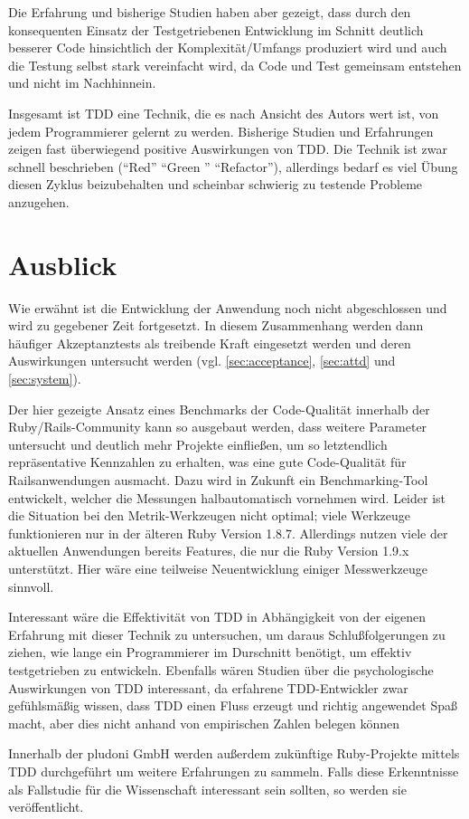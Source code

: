 Die Erfahrung und bisherige Studien haben aber gezeigt, dass durch den konsequenten Einsatz der Testgetriebenen Entwicklung im Schnitt deutlich besserer Code hinsichtlich der Komplexität/Umfangs produziert wird und auch die Testung selbst stark vereinfacht wird, da Code und Test gemeinsam entstehen und nicht im Nachhinnein.

Insgesamt ist TDD eine Technik, die es nach Ansicht des Autors wert ist, von jedem Programmierer gelernt zu werden. Bisherige Studien und Erfahrungen zeigen fast überwiegend positive Auswirkungen von TDD. Die Technik ist zwar schnell beschrieben ("`Red"' "`Green "' "`Refactor"'), allerdings bedarf es viel Übung diesen Zyklus beizubehalten und scheinbar schwierig zu testende Probleme anzugehen.

\section{Ausblick}
Wie erwähnt ist die Entwicklung der Anwendung noch nicht abgeschlossen und wird zu gegebener Zeit fortgesetzt. In diesem Zusammenhang werden dann häufiger Akzeptanztests als treibende Kraft eingesetzt werden und deren Auswirkungen untersucht werden (vgl. \ref{sec:acceptance}, \ref{sec:attd} und \ref{sec:system}).

Der hier gezeigte Ansatz eines Benchmarks der Code-Qualität innerhalb der Ruby/Rails\hyp{}Community kann so ausgebaut werden, dass weitere Parameter untersucht und deutlich mehr Projekte einfließen, um so letztendlich repräsentative Kennzahlen zu erhalten, was eine gute Code-Qualität für Railsanwendungen ausmacht. Dazu wird in Zukunft ein Benchmarking-Tool entwickelt, welcher die Messungen halbautomatisch vornehmen wird. Leider ist die Situation bei den Metrik-Werkzeugen nicht optimal; viele Werkzeuge funktionieren nur in der älteren Ruby Version 1.8.7. Allerdings nutzen viele der aktuellen Anwendungen bereits Features, die nur die Ruby Version 1.9.x unterstützt. Hier wäre eine teilweise Neuentwicklung einiger Messwerkzeuge sinnvoll.

Interessant wäre die Effektivität von TDD in Abhängigkeit von der eigenen Erfahrung mit dieser Technik zu untersuchen, um daraus Schlußfolgerungen zu ziehen, wie lange ein Programmierer im Durschnitt benötigt, um effektiv testgetrieben zu entwickeln. Ebenfalls wären Studien über die psychologische Auswirkungen von TDD interessant, da erfahrene TDD-Entwickler zwar gefühlsmäßig wissen, dass TDD einen Fluss erzeugt und richtig angewendet Spaß macht, aber dies nicht anhand von empirischen Zahlen belegen können

Innerhalb der pludoni GmbH werden außerdem zukünftige Ruby-Projekte mittels TDD durchgeführt um weitere Erfahrungen zu sammeln. Falls diese Erkenntnisse als Fallstudie für die Wissenschaft interessant sein sollten, so werden sie veröffentlicht.


